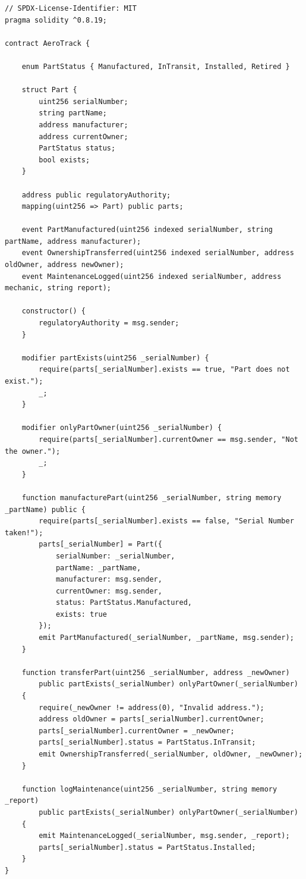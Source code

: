 \documentclass[12pt,a4paper]{article}
\begin{document}
\begin{lstlisting}[caption={AeroTrack.sol -- Complete base contract}]
// SPDX-License-Identifier: MIT
pragma solidity ^0.8.19;

contract AeroTrack {

    enum PartStatus { Manufactured, InTransit, Installed, Retired }

    struct Part {
        uint256 serialNumber;
        string partName;
        address manufacturer;
        address currentOwner;
        PartStatus status;
        bool exists;
    }

    address public regulatoryAuthority;
    mapping(uint256 => Part) public parts;

    event PartManufactured(uint256 indexed serialNumber, string partName, address manufacturer);
    event OwnershipTransferred(uint256 indexed serialNumber, address oldOwner, address newOwner);
    event MaintenanceLogged(uint256 indexed serialNumber, address mechanic, string report);

    constructor() {
        regulatoryAuthority = msg.sender;
    }

    modifier partExists(uint256 _serialNumber) {
        require(parts[_serialNumber].exists == true, "Part does not exist.");
        _;
    }

    modifier onlyPartOwner(uint256 _serialNumber) {
        require(parts[_serialNumber].currentOwner == msg.sender, "Not the owner.");
        _;
    }

    function manufacturePart(uint256 _serialNumber, string memory _partName) public {
        require(parts[_serialNumber].exists == false, "Serial Number taken!");
        parts[_serialNumber] = Part({
            serialNumber: _serialNumber,
            partName: _partName,
            manufacturer: msg.sender,
            currentOwner: msg.sender,
            status: PartStatus.Manufactured,
            exists: true
        });
        emit PartManufactured(_serialNumber, _partName, msg.sender);
    }

    function transferPart(uint256 _serialNumber, address _newOwner)
        public partExists(_serialNumber) onlyPartOwner(_serialNumber)
    {
        require(_newOwner != address(0), "Invalid address.");
        address oldOwner = parts[_serialNumber].currentOwner;
        parts[_serialNumber].currentOwner = _newOwner;
        parts[_serialNumber].status = PartStatus.InTransit;
        emit OwnershipTransferred(_serialNumber, oldOwner, _newOwner);
    }

    function logMaintenance(uint256 _serialNumber, string memory _report)
        public partExists(_serialNumber) onlyPartOwner(_serialNumber)
    {
        emit MaintenanceLogged(_serialNumber, msg.sender, _report);
        parts[_serialNumber].status = PartStatus.Installed;
    }
}
\end{lstlisting}
\end{document}
